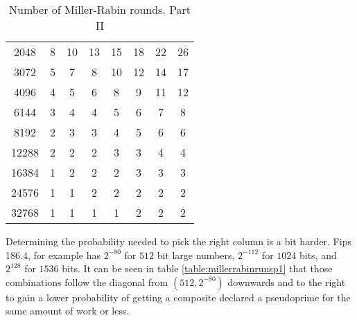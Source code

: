 \documentclass[synpaper]{book}
\begin{document}
\begin{table}[h]
\begin{center}
\begin{tabular}{c c c c c c c c}
      \\
      2048                & 8                   & 10                  & 13                  & 15  &
      18                  & 22                  & 26
      \\
      3072                & 5                   & 7                   & 8                   & 10  &
      12                  & 14                  & 17
      \\
      4096                & 4                   & 5                   & 6                   & 8   &
      9                   & 11                  & 12
      \\
      6144                & 3                   & 4                   & 4                   & 5   &
      6                   & 7                   & 8
      \\
      8192                & 2                   & 3                   & 3                   & 4   &
      5                   & 6                   & 6
      \\
      12288               & 2                   & 2                   & 2                   & 3   &
      3                   & 4                   & 4
      \\
      16384               & 1                   & 2                   & 2                   & 2   &
      3                   & 3                   & 3
      \\
      24576               & 1                   & 1                   & 2                   & 2   &
      2                   & 2                   & 2
      \\
      32768               & 1                   & 1                   & 1                   & 1   &
      2                   & 2                   & 2
    \end{tabular}
    \caption{ Number of Miller-Rabin rounds. Part II } \label{table:millerrabinrunsp2}
  \end{center}
\end{table}

Determining the probability needed to pick the right column is a bit harder. Fips 186.4, for
example has $2^{-80}$ for $512$ bit large numbers, $2^{-112}$ for $1024$ bits, and $2^{128}$ for
$1536$ bits. It can be seen in table \ref{table:millerrabinrunsp1} that those combinations follow
the diagonal from $(512,2^{-80})$ downwards and to the right to gain a lower probability of getting
a composite declared a pseudoprime for the same amount of work or less.
\end{document}
